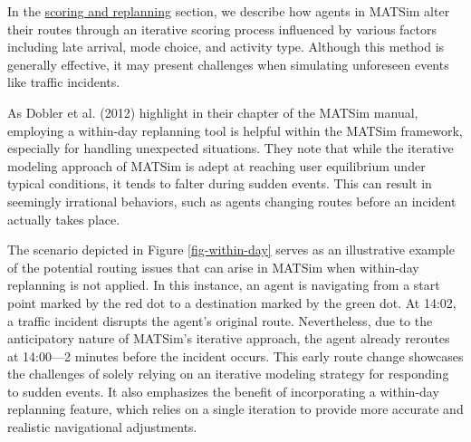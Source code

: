 \documentclass[fancy, oneside, mastersfancy, ms]{byuthesis}
\begin{document}
In the \protect\hyperlink{sec-MATSim_Score}{scoring and replanning}
section, we describe how agents in MATSim alter their routes through an
iterative scoring process influenced by various factors including late
arrival, mode choice, and activity type. Although this method is
generally effective, it may present challenges when simulating
unforeseen events like traffic incidents.

As Dobler et al. (2012) highlight in their chapter of the MATSim manual,
employing a within-day replanning tool is helpful within the MATSim
framework, especially for handling unexpected situations. They note that
while the iterative modeling approach of MATSim is adept at reaching
user equilibrium under typical conditions, it tends to falter during
sudden events. This can result in seemingly irrational behaviors, such
as agents changing routes before an incident actually takes place.

The scenario depicted in Figure \ref{fig-within-day} serves as an
illustrative example of the potential routing issues that can arise in
MATSim when within-day replanning is not applied. In this instance, an
agent is navigating from a start point marked by the red dot to a
destination marked by the green dot. At 14:02, a traffic incident
disrupts the agent's original route. Nevertheless, due to the
anticipatory nature of MATSim's iterative approach, the agent already
reroutes at 14:00---2 minutes before the incident occurs. This early
route change showcases the challenges of solely relying on an iterative
modeling strategy for responding to sudden events. It also emphasizes
the benefit of incorporating a within-day replanning feature, which
relies on a single iteration to provide more accurate and realistic
navigational adjustments.
\end{document}
